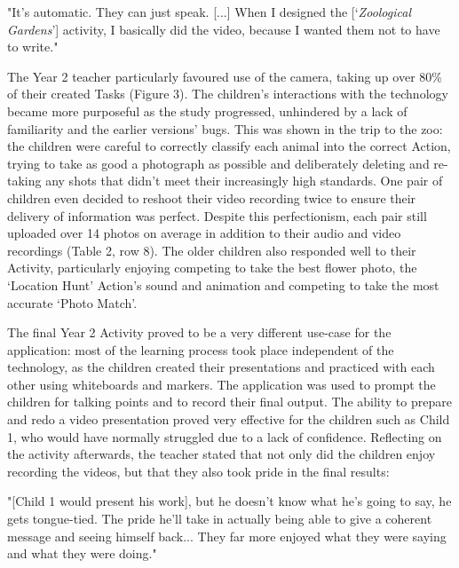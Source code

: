 \begin{displayquote}
"It’s automatic. They can just speak. [...] When I designed the [‘\textit{Zoological Gardens}’] activity, I basically did the video, because I wanted them not to have to write."
\end{displayquote}

The Year 2 teacher particularly favoured use of the camera, taking up over 80\% of their created Tasks (Figure 3). The children’s interactions with the technology became more purposeful as the study progressed, unhindered by a lack of familiarity and the earlier versions’ bugs. This was shown in the trip to the zoo: the children were careful to correctly classify each animal into the correct Action, trying to take as good a photograph as possible and deliberately deleting and re-taking any shots that didn’t meet their increasingly high standards. One pair of children even decided to reshoot their video recording twice to ensure their delivery of information was perfect. Despite this perfectionism, each pair still uploaded over 14 photos on average in addition to their audio and video recordings (Table 2, row 8). The older children also responded well to their Activity, particularly enjoying competing to take the best flower photo, the ‘Location Hunt’ Action’s sound and animation and competing to take the most accurate ‘Photo Match’.

The final Year 2 Activity proved to be a very different use-case for the application: most of the learning process took place independent of the technology, as the children created their presentations and practiced with each other using whiteboards and markers. The application was used to prompt the children for talking points and to record their final output. The ability to prepare and redo a video presentation proved very effective for the children such as Child 1, who would have normally struggled due to a lack of confidence. Reflecting on the activity afterwards, the teacher stated that not only did the children enjoy recording the videos, but that they also took pride in the final results: 

\begin{displayquote}
"[Child 1 would present his work], but he doesn't know what he’s going to say, he gets tongue-tied. The pride he’ll take in actually being able to give a coherent message and seeing himself back... They far more enjoyed what they were saying and what they were doing."
\end{displayquote}

